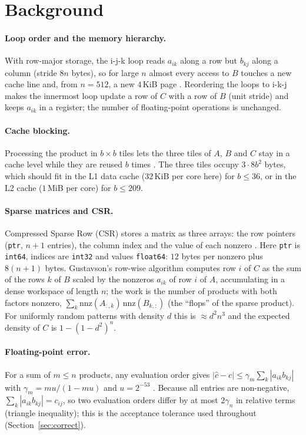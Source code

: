\section{Background}

\paragraph{Loop order and the memory hierarchy.} With row-major storage, the i-j-k loop reads $a_{ik}$ along a row but $b_{kj}$ along a
column (stride $8n$ bytes), so for large $n$ almost every access to $B$ touches a new cache line and, from $n=512$, a new $4$\,KiB page
\cite{drepper,hennessy}. Reordering the loops to i-k-j makes the innermost loop update a row of $C$ with a row of $B$ (unit stride) and keeps
$a_{ik}$ in a register; the number of floating-point operations is unchanged.

\paragraph{Cache blocking.} Processing the product in $b\times b$ tiles lets the three tiles of $A$, $B$ and $C$ stay in a cache level while
they are reused $b$ times \cite{lam,goto}. The three tiles occupy $3\cdot8b^2$ bytes, which should fit in the L1 data cache ($32$\,KiB per core here)
for $b\le36$, or in the L2 cache ($1$\,MiB per core) for $b\le209$.

\paragraph{Sparse matrices and CSR.} Compressed Sparse Row (CSR) stores a matrix as three arrays: the row pointers
(\texttt{ptr}, $n+1$ entries), the column index and the value of each nonzero \cite{saad}. Here \texttt{ptr} is \texttt{int64}, indices are \texttt{int32}
and values \texttt{float64}: $12$ bytes per nonzero plus $8(n+1)$ bytes. Gustavson's row-wise algorithm \cite{gustavson} computes row $i$ of $C$ as the
sum of the rows $k$ of $B$ scaled by the nonzeros $a_{ik}$ of row $i$ of $A$, accumulating in a dense workspace of length $n$; the work is the
number of products with both factors nonzero, $\sum_k \text{nnz}(A_{:,k})\,\text{nnz}(B_{k,:})$ (the ``flops'' of the sparse product).
For uniformly random patterns with density $d$ this is $\approx d^2n^3$ and the expected density of $C$ is $1-(1-d^2)^n$.

\paragraph{Floating-point error.} For a sum of $m\le n$ products, any evaluation order gives $|\hat c-c|\le\gamma_m\sum_k|a_{ik}b_{kj}|$ with
$\gamma_m=mu/(1-mu)$ and $u=2^{-53}$ \cite{higham,goldberg}. Because all entries are non-negative, $\sum_k|a_{ik}b_{kj}|=c_{ij}$, so two evaluation
orders differ by at most $2\gamma_n$ in relative terms (triangle inequality); this is the acceptance tolerance used throughout (Section~\ref{sec:correct}).

